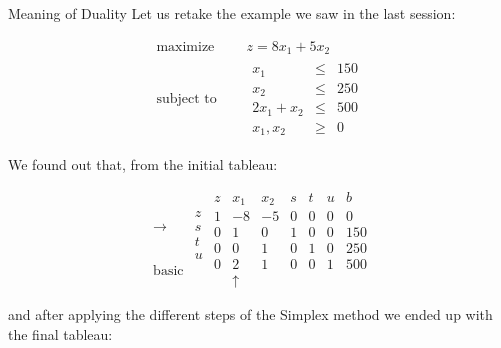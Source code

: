 \documentclass[c]{beamer}
\begin{document}
\begin{frame}[allowframebreaks]{Meaning of Duality}
  Let us retake the example we saw in the last session:

  \begin{equation*}
    \begin{aligned}
      \text{maximize } \quad & z = 8x_1+5x_2 \\
      \text{subject to }\quad &
      \begin{array}{rcl}
        x_1 &\leq &150 \\
        x_2 &\leq &250 \\
        2x_1+x_2 &\leq &500 \\
        x_1,x_2 &\geq& 0
      \end{array}
    \end{aligned}
  \end{equation*}

  We found out that, from the initial tableau:

\begin{equation*}
\begin{array}{cc}
&\\
&z \\
\rightarrow &s \\
&t \\
&u\\
\mathrm{basic}
\end{array}
%
\begin{array}{c|ccccc|c}
  z & x_1 & x_2 & s & t & u & b \\ \hline
  1 & -8 & -5 & 0 & 0 & 0 & 0 \\ \hline
  0 & 1 & 0 & 1 & 0 & 0 & 150  \\
  0 & 0 & 1 & 0 & 1 & 0 & 250 \\
  0 & 2 & 1 & 0 & 0 & 1 & 500 \\
    & \uparrow & & & & &
\end{array}
\end{equation*}

and after applying the different steps of the Simplex method we ended up with the final tableau:


\end{frame}
\end{document}
